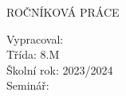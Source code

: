\begin{titlepage}
    \begin{center}
       \Large
       \textbf{\school}
       \vspace{4cm}
 
       \Large
       ROČNÍKOVÁ PRÁCE 
       \vspace{0.5cm}
 
       \huge
       \textbf{\project}
    \end{center}
 
    \vfill
 
    \Large \noindent
    Vypracoval: \name\\
    Třída: 8.M\\
    Školní rok: 2023/2024\\
    Seminář: \seminar
 \end{titlepage}